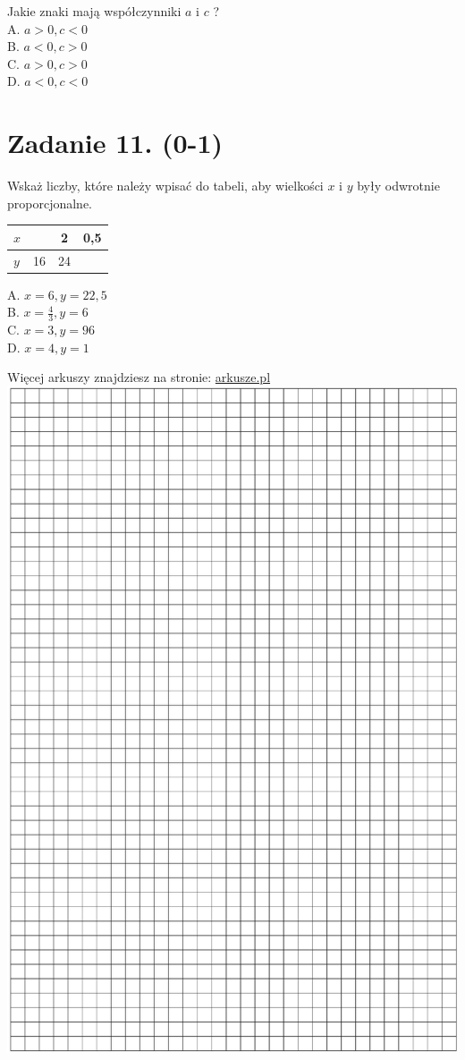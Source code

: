 \documentclass[10pt]{article}
\begin{document}
Jakie znaki mają współczynniki \(a\) i \(c\) ?\\
A. \(a>0, c<0\)\\
B. \(a<0, c>0\)\\
C. \(a>0, c>0\)\\
D. \(a<0, c<0\)

\section*{Zadanie 11. (0-1)}
Wskaż liczby, które należy wpisać do tabeli, aby wielkości \(x\) i \(y\) były odwrotnie proporcjonalne.

\begin{center}
\begin{tabular}{|l|l|c|c|}
\hline
\(x\) &  & 2 & 0,5 \\
\hline
\(y\) & 16 & 24 &  \\
\hline
\end{tabular}
\end{center}

A. \(x=6, y=22,5\)\\
B. \(x=\frac{4}{3}, y=6\)\\
C. \(x=3, y=96\)\\
D. \(x=4, y=1\)

Więcej arkuszy znajdziesz na stronie: \href{http://arkusze.pl}{arkusze.pl}\\
\includegraphics[max width=\textwidth, center]{2024_11_21_dd21f7544b65bcf1b3c7g-05}
\end{document}
